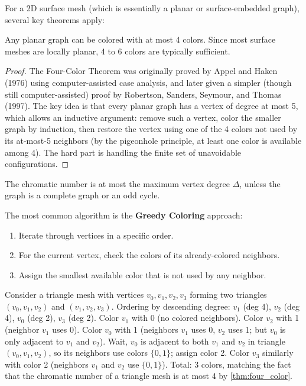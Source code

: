 For a 2D surface mesh (which is essentially a planar or surface-embedded graph), several key theorems apply:

\begin{theorem}\label{thm:four_color}
Any planar graph can be colored with at most 4 colors\cite{welsh1967}. Since most surface meshes are locally planar, 4 to 6 colors are typically sufficient.
\end{theorem}

\begin{proof}
The Four-Color Theorem was originally proved by Appel and Haken (1976) using computer-assisted case analysis, and later given a simpler (though still computer-assisted) proof by Robertson, Sanders, Seymour, and Thomas (1997). The key idea is that every planar graph has a vertex of degree at most 5, which allows an inductive argument: remove such a vertex, color the smaller graph by induction, then restore the vertex using one of the 4 colors not used by its at-most-5 neighbors (by the pigeonhole principle, at least one color is available among 4). The hard part is handling the finite set of unavoidable configurations.
\end{proof}

\begin{theorem}\label{thm:brooks}
The chromatic number is at most the maximum vertex degree $\Delta$, unless the graph is a complete graph or an odd cycle.
\end{theorem}

The most common algorithm is the \textbf{Greedy Coloring} approach:
\begin{enumerate}
    \item Iterate through vertices in a specific order.
    \item For the current vertex, check the colors of its already-colored neighbors.
    \item Assign the smallest available color that is not used by any neighbor.
\end{enumerate}

\begin{example}\label{ex:greedy_coloring}
Consider a triangle mesh with vertices $v_0, v_1, v_2, v_3$ forming two triangles $(v_0,v_1,v_2)$ and $(v_1,v_2,v_3)$. Ordering by descending degree: $v_1$ (deg 4), $v_2$ (deg 4), $v_0$ (deg 2), $v_3$ (deg 2). Color $v_1$ with 0 (no colored neighbors). Color $v_2$ with 1 (neighbor $v_1$ uses 0). Color $v_0$ with 1 (neighbors $v_1$ uses 0, $v_2$ uses 1; but $v_0$ is only adjacent to $v_1$ and $v_2$). Wait, $v_0$ is adjacent to both $v_1$ and $v_2$ in triangle $(v_0,v_1,v_2)$, so its neighbors use colors $\{0,1\}$; assign color 2. Color $v_3$ similarly with color 2 (neighbors $v_1$ and $v_2$ use $\{0,1\}$). Total: 3 colors, matching the fact that the chromatic number of a triangle mesh is at most 4 by \cref{thm:four_color}.
\end{example}

